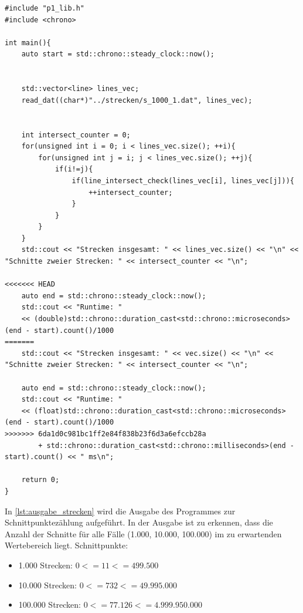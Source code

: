 \documentclass[12pt]{scrartcl}
\begin{document}
\begin{lstlisting}[style=CStyle, caption={strecken.cpp: Aufgruf der Bibliotheksfunktionen},captionpos=b]
#include "p1_lib.h"
#include <chrono>

int main(){
    auto start = std::chrono::steady_clock::now();


    std::vector<line> lines_vec;
    read_dat((char*)"../strecken/s_1000_1.dat", lines_vec);


    int intersect_counter = 0;
    for(unsigned int i = 0; i < lines_vec.size(); ++i){
        for(unsigned int j = i; j < lines_vec.size(); ++j){
            if(i!=j){
                if(line_intersect_check(lines_vec[i], lines_vec[j])){
                    ++intersect_counter;
                }
            }
        }
    }
    std::cout << "Strecken insgesamt: " << lines_vec.size() << "\n" << "Schnitte zweier Strecken: " << intersect_counter << "\n";

<<<<<<< HEAD
    auto end = std::chrono::steady_clock::now();
    std::cout << "Runtime: "
    << (double)std::chrono::duration_cast<std::chrono::microseconds>(end - start).count()/1000
=======
    std::cout << "Strecken insgesamt: " << vec.size() << "\n" << "Schnitte zweier Strecken: " << intersect_counter << "\n";

    auto end = std::chrono::steady_clock::now();
    std::cout << "Runtime: "
    << (float)std::chrono::duration_cast<std::chrono::microseconds>(end - start).count()/1000
>>>>>>> 6da1d0c981bc1ff2e84f838b23f6d3a6efccb28a
        + std::chrono::duration_cast<std::chrono::milliseconds>(end - start).count() << " ms\n";

    return 0;
}
\end{lstlisting}

In \autoref{lst:ausgabe_strecken} wird die Ausgabe des Programmes zur Schnittpunktezählung aufgeführt.
In der Ausgabe ist zu erkennen, dass die Anzahl der Schnitte für alle Fälle (1.000, 10.000, 100.000) im zu erwartenden Wertebereich liegt.
Schnittpunkte:
\begin{itemize}
<<<<<<< HEAD
    \item 1.000 Strecken: $0<= 11 <= 499.500$
    \item 10.000 Strecken: $0<= 732 <= 49.995.000$
    \item 100.000 Strecken: $0<= 77.126 <= 4.999.950.000$
\end{itemize}
\end{document}
